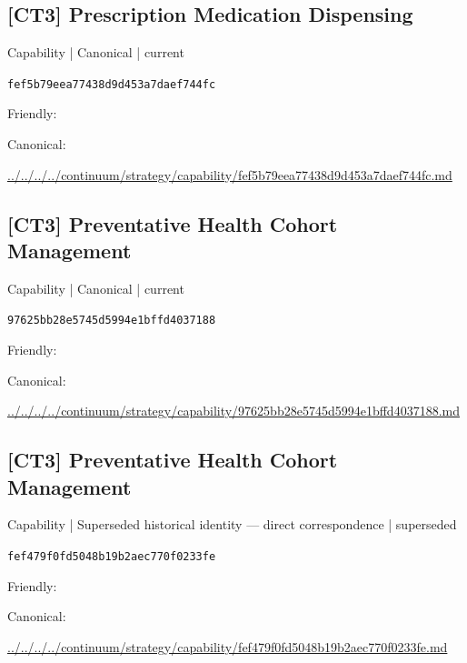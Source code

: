 \documentclass[10pt,a4paper]{article}
\begin{document}
\subsection*{[CT3] Prescription Medication Dispensing}
{\small Capability | Canonical | current}\par
\texttt{fef5b79eea77438d9d453a7daef744fc}\par
Friendly: \par
Canonical: \par
{\footnotesize\url{../../../../continuum/strategy/capability/fef5b79eea77438d9d453a7daef744fc.md}}\par
\subsection*{[CT3] Preventative Health Cohort Management}
{\small Capability | Canonical | current}\par
\texttt{97625bb28e5745d5994e1bffd4037188}\par
Friendly: \par
Canonical: \par
{\footnotesize\url{../../../../continuum/strategy/capability/97625bb28e5745d5994e1bffd4037188.md}}\par
\subsection*{[CT3] Preventative Health Cohort Management}
{\small Capability | Superseded historical identity — direct correspondence | superseded}\par
\texttt{fef479f0fd5048b19b2aec770f0233fe}\par
Friendly: \par
Canonical: \par
{\footnotesize\url{../../../../continuum/strategy/capability/fef479f0fd5048b19b2aec770f0233fe.md}}\par
\end{document}
